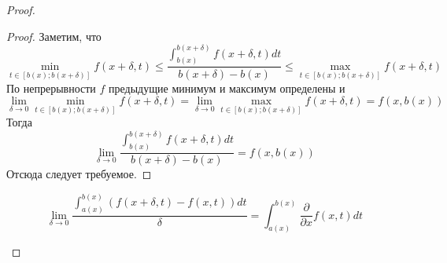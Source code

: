 \documentclass[12pt,a4paper]{article}
\begin{document}
\begin{proof}
\begin{proof}
            Заметим, что
            \[
                \min_{t \in [b(x); b(x + \delta)]} f(x + \delta, t)
                \leqslant \frac{\int_{b(x)}^{b(x + \delta)} f(x + \delta, t) dt}{b(x + \delta) - b(x)}
                \leqslant \max_{t \in [b(x); b(x + \delta)]} f(x + \delta, t)
            \]
            По непрерывности $f$ предыдущие минимум и максимум определены и
            \[
                \lim_{\delta \to 0} \min_{t \in [b(x); b(x + \delta)]} f(x + \delta, t)
                = \lim_{\delta \to 0} \max_{t \in [b(x); b(x + \delta)]} f(x + \delta, t)
                = f(x, b(x))
            \]
            Тогда 
            \[
                \lim_{\delta \to 0} \frac{\int_{b(x)}^{b(x + \delta)} f(x + \delta, t) dt}{b(x + \delta) - b(x)}
                = f(x, b(x))
            \]
            Отсюда следует требуемое.
        \end{proof}

        \begin{thlemma}
            \[
                \lim_{\delta \to 0} \frac{\int_{a(x)}^{b(x)} (f(x + \delta, t) - f(x, t)) dt}{\delta}
                = \int_{a(x)}^{b(x)} \frac{\partial}{\partial x} f(x, t) dt
            \]
        \end{thlemma}


\end{proof}
\end{document}
